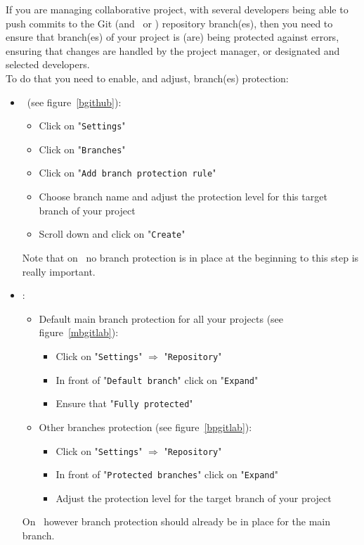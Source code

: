 If you are managing collaborative project, with several developers being able to push commits to the Git (and \github\ or \gitlab) repository branch(es), 
then you need to ensure that branch(es) of your project is (are) being protected against errors, ensuring that changes are handled by the project manager, or designated and selected developers. \\
To do that you need to enable, and adjust, branch(es) protection:
\begin{itemize}
\item \github\ (see figure~\ref{bgithub}):
\begin{itemize}
\item Click on "\texttt{Settings}"
\item Click on "\texttt{Branches}"
\item Click on "\texttt{Add branch protection rule}"
\item Choose branch name and adjust the protection level for this target branch of your project
\item Scroll down and click on "\texttt{Create}"
\end{itemize}
Note that on \github\ no branch protection is in place at the beginning to this step is really important. 
\item \gitlab:
\begin{itemize}
\item Default main branch protection for all your projects (see figure~\ref{mbgitlab}):
\begin{itemize}
\item Click on "\texttt{Settings}" $\Longrightarrow$ "\texttt{Repository}"
\item In front of "\texttt{Default branch}" click on "\texttt{Expand}"
\item Ensure that "\texttt{Fully protected}" 
\end{itemize}
\item Other branches protection (see figure~\ref{bpgitlab}):
\begin{itemize}
\item Click on "\texttt{Settings}" $\Longrightarrow$ "\texttt{Repository}"
\item In front of "\texttt{Protected branches}" click on "\texttt{Expand}"
\item Adjust the protection level for the target branch of your project
\end{itemize}
\end{itemize}
On \gitlab\ however branch protection should already be in place for the main branch.
\end{itemize}

